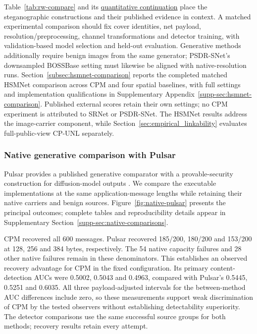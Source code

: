 \documentclass[pdflatex,sn-mathphys-num]{sn-jnl}%
\theoremstyle{definition}
\theoremstyle{game}
\theoremstyle{thmstyleone}%
\theoremstyle{thmstyletwo}%
\theoremstyle{thmstylethree}%
\begin{document}
Table~\ref{tab:rw-compare} and its
\hyperref[tab:rw-quantitative]{quantitative continuation} place the
steganographic constructions and their published evidence in context. A matched
experimental comparison should fix cover identities, net payload,
resolution/preprocessing, channel transformations and detector training,
with validation-based model selection and held-out evaluation. Generative
methods additionally require benign images from the same generator;
PSDR-SNet's downsampled BOSSBase setting must likewise be aligned with
native-resolution runs. Section~\ref{subsec:hsmnet-comparison}
reports the completed matched HSMNet comparison across CPM and four
spatial baselines, with full settings and implementation qualifications
in Supplementary Appendix~\ref{supp-sec:hsmnet-comparison}. Published
external scores retain their own settings; no CPM experiment is attributed
to SRNet or PSDR-SNet. The HSMNet results address the image-carrier
component, while Section~\ref{sec:empirical_linkability} evaluates
full-public-view CP-UNL separately.

\subsubsection{Native generative comparison with Pulsar}
\label{subsec:native-pulsar}
Pulsar provides a published generative comparator with a provable-security
construction for diffusion-model outputs \cite{Jois2024Pulsar}.
We compare the executable implementations at the same application-message
lengths while retaining their native carriers and benign sources.
Figure~\ref{fig:native-pulsar} presents the principal outcomes; complete
tables and reproducibility details appear in Supplementary
Section~\ref{supp-sec:native-comparisons}.

CPM recovered all 600 messages. Pulsar recovered 185/200, 180/200 and
153/200 at 128, 256 and 384 bytes, respectively. The 54 native capacity
failures and 28 other native failures remain in these denominators.
This establishes an observed recovery advantage for CPM in the fixed
configuration. Its primary content-detection AUCs were 0.5002, 0.5043
and 0.4963, compared with Pulsar's 0.5445, 0.5251 and 0.6035.
All three payload-adjusted intervals for the between-method AUC
differences include zero, so these measurements support weak
discrimination of CPM by the tested observers without establishing
detectability superiority. The detector comparisons use the same
successful source groups for both methods; recovery results retain
every attempt.
\end{document}
